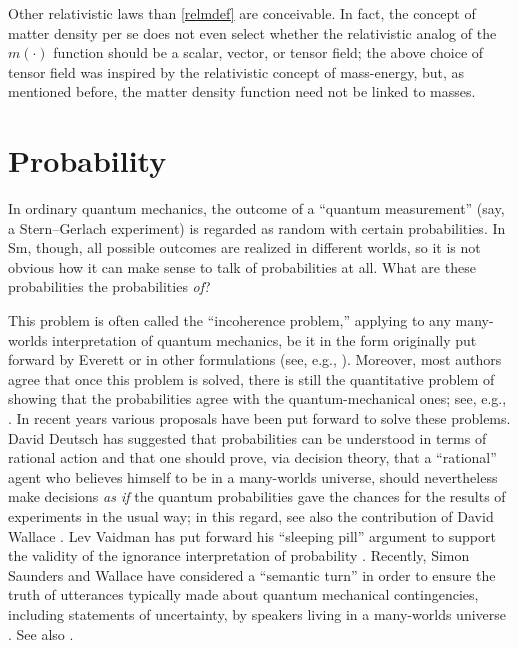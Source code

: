 \documentclass[12pt]{article}
\begin{document}
Other relativistic laws than \eqref{relmdef} are conceivable. In fact, the concept of matter density per se does not even select whether the relativistic analog of the $m(\cdot)$ function should be a scalar, vector, or tensor field; the above choice of tensor field was inspired by the relativistic concept of mass-energy, but, as mentioned before, the matter density function need not be linked to masses. 





\section{Probability}\label{sec:probability}

In ordinary quantum mechanics, the outcome of a ``quantum measurement'' (say, a Stern--Gerlach experiment) is regarded as random with certain probabilities. In Sm, though, all possible outcomes are realized in different worlds, so it is not obvious how it can make sense to talk of probabilities at all. What are these probabilities the probabilities \emph{of}?

This problem is often called the ``incoherence problem,'' applying to any many-worlds interpretation of quantum mechanics, be it in the form originally put forward by Everett \cite{evethesis, Eve57} or in other formulations (see, e.g., \cite{deutsch0}). Moreover, most authors agree that once this problem is solved, there is still the quantitative problem of showing that the probabilities agree with the quantum-mechanical ones; see, e.g., \cite{greaves2004}. 
In recent years various proposals have been put forward to solve these problems. David Deutsch has suggested that probabilities can be understood in terms of rational action \cite{deutsch} and that one should prove, via decision theory, that a ``rational'' agent  who believes himself to be in a many-worlds universe, should nevertheless make decisions {\em as if}  the quantum probabilities gave the  chances for the results of experiments in the usual way; in this regard, see also the contribution of David Wallace \cite{wallace}. Lev Vaidman has put forward his ``sleeping pill'' argument to support the validity of the ignorance interpretation of probability \cite{vaidman, vaidman1}. Recently, Simon Saunders and Wallace  have considered a ``semantic turn'' in order to ensure the truth of utterances typically made about quantum mechanical contingencies, including statements of uncertainty, by speakers living in a many-worlds universe \cite{wallace06, saunderswallace}. See also \cite{tappenden, greaves2004, lewis2007, baker2007}.
\end{document}
